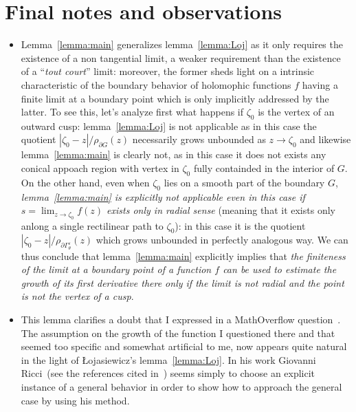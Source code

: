 \documentclass[a4paper,10pt]{article}
\begin{document}
\section{Final notes and observations}
\begin{itemize}
\item Lemma~\ref{lemma:main} generalizes lemma~\ref{lemma:Loj} as it only requires the existence of a non tangential limit, a  weaker requirement than the existence of a ``\emph{tout court}'' limit: moreover, the former sheds light on a intrinsic characteristic of the boundary behavior of holomophic functions $f$ having a finite limit at a boundary point which is only implicitly addressed by the latter. To see this, let's analyze first what happens if $\zeta_0$ is the vertex of an outward cusp: lemma~\ref{lemma:Loj} is not applicable as in this case the quotient $\left|\zeta_0-z\right| / \rho_{\partial G}(z)$ necessarily grows unbounded as $z\to\zeta_0$ and likewise lemma~\ref{lemma:main} is clearly not, as in this case it does not exists any conical appoach region with vertex in $\zeta_0$ fully containded in the interior of $G$. On the other hand, even when $\zeta_0$ lies on a smooth part of the boundary $G$, \emph{lemma~\ref{lemma:main} is explicitly not applicable even in this case if $s=\lim_{z \to\zeta_0} f(z)$ exists only in radial sense} (meaning that it exists only anlong a single rectilinear path to $\zeta_0$): in this case it is the quotient  $\left|\zeta_0-z\right| / \rho_{\partial \Gamma_{\theta}^{\varepsilon}}(z)$ which grows unbounded in perfectly analogous way. We can thus conclude that lemma~\ref{lemma:main} explicitly implies that \emph{the finiteness of the limit at a boundary point of a function $f$ can be used to estimate the growth of its first derivative there only if the limit is not radial and the point is not the vertex of a cusp}.
\item This lemma clarifies a doubt that I expressed in a MathOverflow question~\cite{Tampieri2021}. The assumption on the growth of the function I questioned there and that seemed too specific and somewhat artificial to me, now appears quite natural in the light of Łojasiewicz's lemma~\ref{lemma:Loj}. In his work Giovanni Ricci~(see the references cited in~\cite{Tampieri2021}) seems simply to choose an explicit instance of a general behavior in order to show how to approach the general case by using his method.
\end{itemize}



\end{document}
